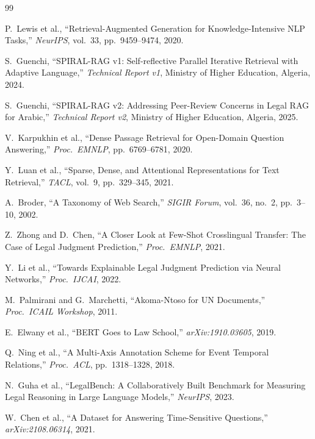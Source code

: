 \documentclass[12pt,a4paper]{article}
\begin{document}
\begin{thebibliography}{99}

P.~Lewis et al., ``Retrieval-Augmented Generation for Knowledge-Intensive NLP Tasks,''
\textit{NeurIPS}, vol.~33, pp.~9459--9474, 2020.

S.~Guenchi, ``SPIRAL-RAG v1: Self-reflective Parallel Iterative Retrieval with Adaptive Language,''
\textit{Technical Report v1}, Ministry of Higher Education, Algeria, 2024.

S.~Guenchi, ``SPIRAL-RAG v2: Addressing Peer-Review Concerns in Legal RAG for Arabic,''
\textit{Technical Report v2}, Ministry of Higher Education, Algeria, 2025.

V.~Karpukhin et al., ``Dense Passage Retrieval for Open-Domain Question Answering,''
\textit{Proc.\ EMNLP}, pp.~6769--6781, 2020.

Y.~Luan et al., ``Sparse, Dense, and Attentional Representations for Text Retrieval,''
\textit{TACL}, vol.~9, pp.~329--345, 2021.

A.~Broder, ``A Taxonomy of Web Search,'' \textit{SIGIR Forum}, vol.~36, no.~2,
pp.~3--10, 2002.

Z.~Zhong and D.~Chen, ``A Closer Look at Few-Shot Crosslingual Transfer: The Case of
Legal Judgment Prediction,'' \textit{Proc.\ EMNLP}, 2021.

Y.~Li et al., ``Towards Explainable Legal Judgment Prediction via Neural Networks,''
\textit{Proc.\ IJCAI}, 2022.

M.~Palmirani and G.~Marchetti, ``Akoma-Ntoso for UN Documents,''
\textit{Proc.\ ICAIL Workshop}, 2011.

E.~Elwany et al., ``BERT Goes to Law School,'' \textit{arXiv:1910.03605}, 2019.

Q.~Ning et al., ``A Multi-Axis Annotation Scheme for Event Temporal Relations,''
\textit{Proc.\ ACL}, pp.~1318--1328, 2018.

N.~Guha et al., ``LegalBench: A Collaboratively Built Benchmark for Measuring Legal
Reasoning in Large Language Models,'' \textit{NeurIPS}, 2023.

W.~Chen et al., ``A Dataset for Answering Time-Sensitive Questions,''
\textit{arXiv:2108.06314}, 2021.


\end{thebibliography}
\end{document}
